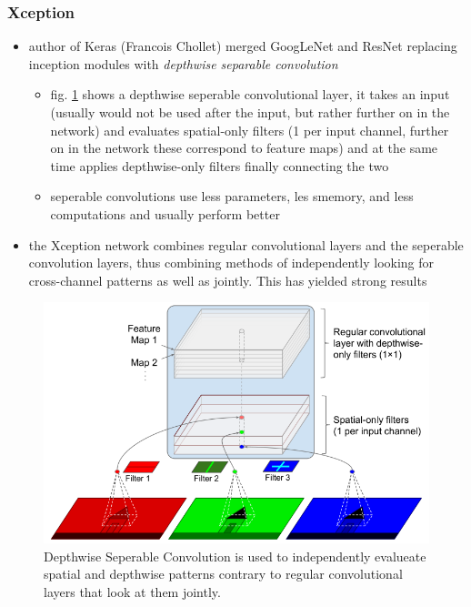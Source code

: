 \documentclass[12pt,a4paper]{article}
\begin{document}

\subsubsection{Xception} %
\label{ssub:xception}
\begin{itemize}
  \item author of Keras (Francois Chollet) merged GoogLeNet and ResNet replacing inception modules with \textit{depthwise separable convolution} 
  \begin{itemize}
    \item fig. \ref{fig:seperable_convolution} shows a depthwise seperable convolutional layer, it takes an input (usually would not be used after the input, but rather further on in the network) and evaluates spatial-only filters (1 per input channel, further on in the network these correspond to feature maps) and at the same time applies depthwise-only filters finally connecting the two
    \item seperable convolutions use less parameters, les smemory, and less computations and usually perform better
  \end{itemize}
  \item the Xception network combines regular convolutional layers and the seperable convolution layers, thus combining methods of independently looking for cross-channel patterns as well as jointly. This has yielded strong results
\end{itemize}
\begin{figure}
  \centering
  \includegraphics[width=.5\linewidth]{Images/seperable_convolution.png}
  \caption[Depthwise Seperable Convolution]{Depthwise Seperable Convolution is used to independently evalueate spatial and depthwise patterns contrary to regular convolutional layers that look at them jointly.}
  \label{fig:seperable_convolution}
\end{figure}
\end{document}
